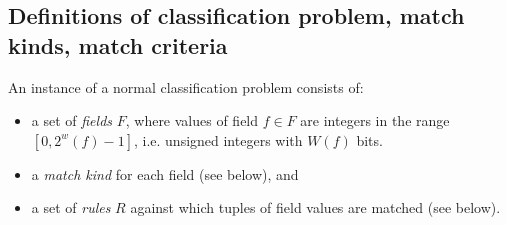 \documentclass[acmsmall]{acmart}
\begin{document}
\subsection{Definitions of classification problem, match kinds, match criteria}

\begin{definition}
\label{defn:normal-classification-problem}
An instance of a normal classification problem consists of:
\begin{itemize}
\item a set of {\em fields} $F$,
  where values of field $f \in F$ are integers in the range $[0, 2^w(f)-1]$,
  i.e. unsigned integers with $W(f)$ bits.
\item a {\em match kind} for each field (see below), and
\item a set of {\em rules} $R$
  against which tuples of field values are matched (see below).
\end{itemize}
\end{definition}
\end{document}
